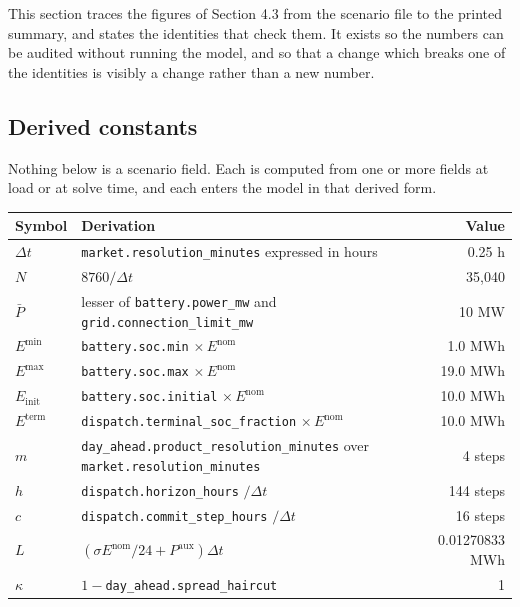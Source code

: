 \documentclass[11pt,a4paper]{article}
\numberwithin{equation}{section}
\begin{document}
This section traces the figures of Section 4.3 from the scenario file to the
printed summary, and states the identities that check them. It exists so the
numbers can be audited without running the model, and so that a change which
breaks one of the identities is visibly a change rather than a new number.

\subsection{Derived constants}

Nothing below is a scenario field. Each is computed from one or more fields at
load or at solve time, and each enters the model in that derived form.

\small
\begin{tabular}{@{}l >{\raggedright\arraybackslash}p{8.6cm} r@{}}
\toprule
Symbol & Derivation & Value \\
\midrule
$\Delta t$        & \nolinkurl{market.resolution_minutes} expressed in hours & 0.25 h \\
$N$               & $8760 / \Delta t$                                        & 35{,}040 \\
$\bar{P}$         & lesser of \nolinkurl{battery.power_mw} and \nolinkurl{grid.connection_limit_mw} & 10 MW \\
$E^{\min}$        & \nolinkurl{battery.soc.min} $\times\, E^{\text{nom}}$     & 1.0 MWh \\
$E^{\max}$        & \nolinkurl{battery.soc.max} $\times\, E^{\text{nom}}$     & 19.0 MWh \\
$E_{\text{init}}$ & \nolinkurl{battery.soc.initial} $\times\, E^{\text{nom}}$ & 10.0 MWh \\
$E^{\text{term}}$ & \nolinkurl{dispatch.terminal_soc_fraction} $\times\, E^{\text{nom}}$ & 10.0 MWh \\
$m$               & \nolinkurl{day_ahead.product_resolution_minutes} over \nolinkurl{market.resolution_minutes} & 4 steps \\
$h$               & \nolinkurl{dispatch.horizon_hours} $/ \Delta t$           & 144 steps \\
$c$               & \nolinkurl{dispatch.commit_step_hours} $/ \Delta t$       & 16 steps \\
$L$               & $(\sigma E^{\text{nom}} / 24 + P^{\text{aux}}) \Delta t$  & 0.01270833 MWh \\
$\kappa$          & $1 - {}$\nolinkurl{day_ahead.spread_haircut}              & 1 \\
\bottomrule
\end{tabular}
\normalsize
\end{document}
